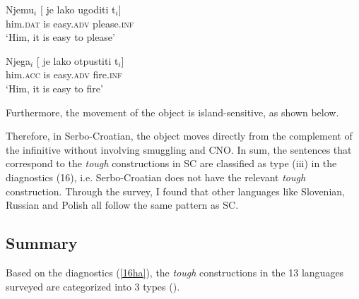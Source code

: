 \documentclass[output=paper,colorlinks,citecolor=brown,
]{langscibook}
\begin{document}
\begin{exe}
 \label{32'ha}
\begin{xlist}
\ex \label{32'aha}
\gll Njemu$_{i}$ [ je  lako  ugoditi t$_{i}$]\\
him.\textsc{dat} {} is easy.\textsc{adv} please.\textsc{inf}\\
\glt ‘Him, it is easy to please’

\ex \label{32'bha}
\gll Njega$_{i}$  [ je  lako otpustiti t$_{i}$]\\
him.\textsc{acc} {} is easy.\textsc{adv} fire.\textsc{inf}\\
\glt ‘Him, it is easy to fire’
\end{xlist}
\end{exe}

Furthermore, the movement of the object is island-sensitive, as shown below. 

\begin{exe}
\ex \label{35ha}
\begin{xlist}

\end{xlist}
\end{exe}

Therefore, in Serbo-Croatian, the object moves directly from the complement of the infinitive without involving smuggling and CNO. In sum, the sentences that correspond to the \textit{tough} constructions in SC are classified as type (iii) in the diagnostics (16), i.e. Serbo-Croatian does not have the relevant \textit{tough} construction. Through the survey, I found that other languages like Slovenian, Russian and Polish all follow the same pattern as SC. 

\subsection{Summary} \label{s3.5ha}
Based on the diagnostics (\ref{16ha}), the \textit{tough} constructions in the 13 languages surveyed are categorized into 3 types ().
\end{document}
